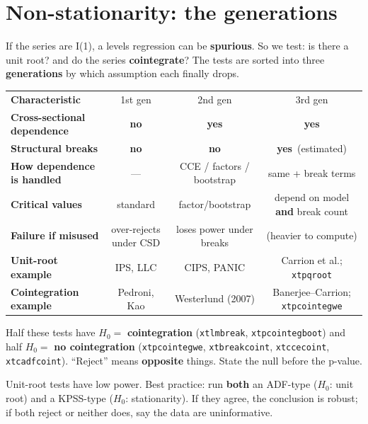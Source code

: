 \documentclass[11pt,a4paper]{article}
\newcommand{\cmd}[1]{\texttt{\textcolor{corange}{#1}}}
\newcommand{\hlt}[2]{\textcolor{#1}{\textbf{#2}}}
\newcommand{\Ito}{I(1)}
\newcommand{\YES}{\textcolor{cgreen}{\textbf{yes}}}
\newcommand{\NO}{\textcolor{cred}{\textbf{no}}}
\begin{document}
\section{Non-stationarity: the generations}

\begin{idea}
If the series are \Ito, a levels regression can be \textbf{spurious}. So we test: is there a unit
root? and do the series \textbf{cointegrate}? The tests are sorted into three
\hlt{cblue}{generations} by which assumption each finally drops.
\end{idea}

\begin{center}
\begin{tabular}{@{}>{\bfseries}l c c c@{}}
\rowcolor{cgrape}\color{white}Characteristic & \color{white}1st gen & \color{white}2nd gen & \color{white}3rd gen\\
Cross-sectional dependence & \NO & \YES & \YES\\
Structural breaks & \NO & \NO & \YES\ (estimated)\\
How dependence is handled & --- & CCE / factors / bootstrap & same + break terms\\
Critical values & standard & factor/bootstrap & depend on model \textbf{and} break count\\
Failure if misused & over-rejects under CSD & loses power under breaks & (heavier to compute)\\
Unit-root example & IPS, LLC & CIPS, PANIC & Carrion et al.; \cmd{xtpqroot}\\
Cointegration example & Pedroni, Kao & Westerlund (2007) & Banerjee--Carrion; \cmd{xtpcointegwe}\\
\end{tabular}
\end{center}

\begin{avoidbox}
Half these tests have $H_0=$ \textbf{cointegration} (\cmd{xtlmbreak}, \cmd{xtpcointegboot}) and
half $H_0=$ \textbf{no cointegration} (\cmd{xtpcointegwe}, \cmd{xtbreakcoint}, \cmd{xtccecoint},
\cmd{xtcadfcoint}). ``Reject'' means \textbf{opposite} things. State the null before the p-value.
\end{avoidbox}

\begin{begbox}
Unit-root tests have low power. Best practice: run \textbf{both} an ADF-type ($H_0$: unit root)
and a KPSS-type ($H_0$: stationarity). If they agree, the conclusion is robust; if both reject or
neither does, say the data are uninformative.
\end{begbox}
\end{document}
